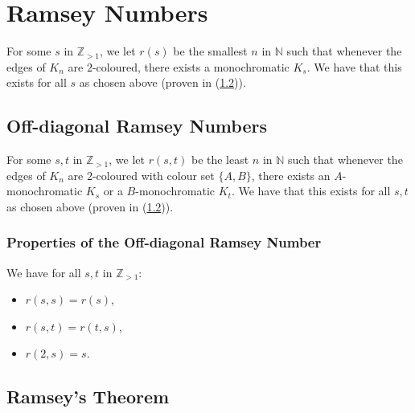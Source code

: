 \section{Ramsey Numbers}

For some $s$ in $\mathbb{Z}_{> 1}$, we let $r(s)$ be the smallest $n$ in $\mathbb{N}$ 
such that whenever the edges of $K_n$ are $2$-coloured, there exists a monochromatic $K_s$.
We have that this exists for all $s$ as chosen above (proven in (\ref{ramt})).

\subsection{Off-diagonal Ramsey Numbers}

For some $s, t$ in $\mathbb{Z}_{> 1}$, we let $r(s, t)$ be the least $n$ in $\mathbb{N}$
such that whenever the edges of $K_n$ are $2$-coloured with colour set $\{A, B\}$, 
there exists an $A$-monochromatic $K_s$ or a $B$-monochromatic $K_t$.
We have that this exists for all $s, t$ as chosen above (proven in (\ref{ramt})).

\subsubsection{Properties of the Off-diagonal Ramsey Number}

We have for all $s, t$ in $\mathbb{Z}_{> 1}$: \begin{itemize}
  \item $r(s, s) = r(s)$,
  \item $r(s, t) = r(t, s)$,
  \item $r(2, s) = s$.
\end{itemize}

\subsection{Ramsey's Theorem} \label{ramt}

